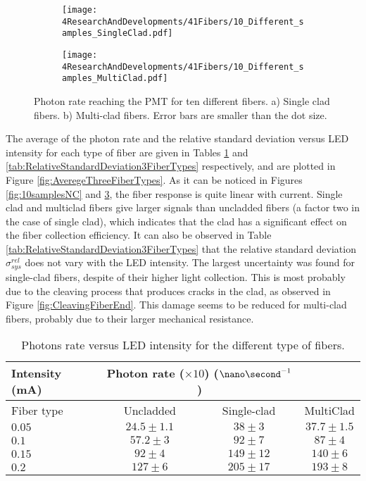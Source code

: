 \begin{figure}
\centering
    \begin{subfigure}[b]{1\textwidth}
    \centering
    \texttt{[image: 4ResearchAndDevelopments/41Fibers/10\_Different\_samples\_SingleClad.pdf]}  
    \caption{\label{subfig:10samplesSC}}
    \end{subfigure}
    \hfill
    \begin{subfigure}[b]{1\textwidth}
    \centering
    \texttt{[image: 4ResearchAndDevelopments/41Fibers/10\_Different\_samples\_MultiClad.pdf]}  
    \caption{\label{subfig:10samplesMC}}
    \end{subfigure}
 \caption{Photon rate reaching the PMT for ten different fibers. a) Single clad fibers. b) Multi-clad fibers. Error bars are smaller than the dot size.}
 \label{fig:10samplesThreeTypes}
\end{figure}
The average of the photon rate and the relative standard deviation versus LED intensity for each type of fiber are given in Tables \ref{tab:10DifferentSamples} and \ref{tab:RelativeStandardDeviation3FiberTypes} respectively, and are plotted in Figure \ref{fig:AveregeThreeFiberTypes}. As it can be noticed in Figures \ref{fig:10samplesNC} and \ref{fig:10samplesThreeTypes}, the fiber response is quite linear with current. Single clad and multiclad fibers give larger signals than uncladded fibers (a factor two in the case of single clad), which indicates that the clad has a significant effect on the fiber collection efficiency. It can also be observed in Table \ref{tab:RelativeStandardDeviation3FiberTypes} that the relative standard deviation $\sigma^{rel}_{sys}$ does not vary with the LED intensity. The largest uncertainty was found for single-clad fibers, despite of their higher light collection. This is most probably due to the cleaving process that produces cracks in the clad, as observed in Figure \ref{fig:CleavingFiberEnd}. This damage seems to be reduced for multi-clad fibers, probably due to their larger mechanical resistance.

\begin{table}[h]
\centering{}%
\begin{tabular}{lccc}
\toprule 
Intensity (mA) & \multicolumn{2}{c}{Photon rate ($\times 10$) ($\nano\second^{-1}$)} \tabularnewline
\midrule
Fiber type & Uncladded & Single-clad & MultiClad \tabularnewline
\midrule
\midrule 
$0.05$ & $24.5 \pm 1.1$ & $38 \pm 3$ & $37.7 \pm 1.5$ \tabularnewline
$0.1$ & $57.2 \pm 3$ & $92 \pm 7$ & $87 \pm 4$ \tabularnewline
$0.15$ & $92 \pm 4$ & $149 \pm 12$ & $140 \pm 6$ \tabularnewline
$0.2$ & $127 \pm 6$ & $205 \pm 17$ & $193 \pm 8$ \tabularnewline
\bottomrule
\end{tabular}
\caption{Photons rate versus LED intensity for the different type of fibers.}
\label{tab:10DifferentSamples}
\end{table}

